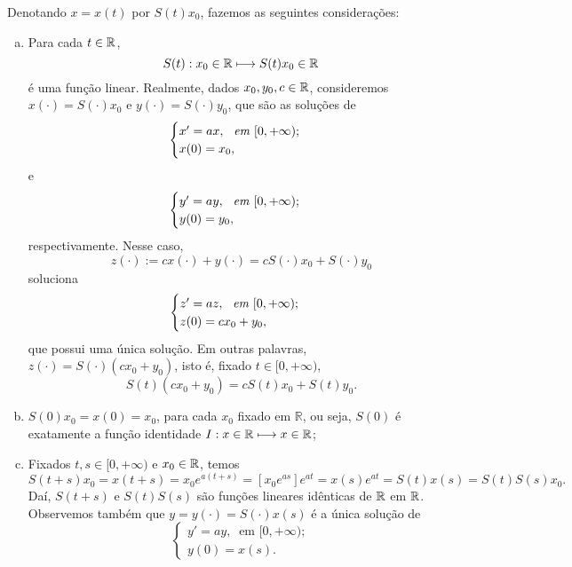 \begin{remark}\label{baby}
Denotando $x=x(t)$ por $S(t)x_0$, fazemos as seguintes considerações:

\begin{enumerate}[(a)]
\item Para cada $t\in \mathbb{R}$, 
\[
\displaystyle S(t): x_0 \in \mathbb{R} \longmapsto S(t)x_0 \in \mathbb{R}
\]
é uma função linear. Realmente, dados $x_0, y_0, c\in \mathbb{R}$, consideremos $x(\cdot) = S(\cdot)x_0$ e $y(\cdot)=S(\cdot)y_0$, que são as soluções de
\[
\begin{cases}
    x'=ax,\ \emph{ em } [0,+\infty);\\
    x(0)=x_0,
\end{cases}
\]
e
\[
\begin{cases}
    y'=ay,\ \emph{ em } [0,+\infty);\\
    y(0)=y_0,
\end{cases}
\]
respectivamente. Nesse caso, 
\[
\displaystyle z(\cdot):=cx(\cdot)+y(\cdot)=cS(\cdot)x_0 + S(\cdot )y_0
\]
soluciona 
\[
\begin{cases}
    z'=az,\ \emph{ em } [0,+\infty);\\
    z(0)=cx_0+y_0,
\end{cases}
\]
que possui uma única solução. Em outras palavras, $z(\cdot) = S(\cdot)(cx_0+y_0)$, isto é, fixado $t\in [0,+\infty)$,
\[
\displaystyle S(t)(cx_0+y_0)=cS(t)x_0+S(t)y_0.
\]
\item $S(0)x_0 = x(0)=x_0$, para cada $x_0$ fixado em $\mathbb R$, ou seja, $S(0)$ é exatamente a função identidade $I:x\in \mathbb{R} \longmapsto x\in \mathbb{R}$;
\item Fixados $t,s\in [0,+\infty)$ e $x_0 \in \mathbb{R}$, temos
\begin{equation*}
\displaystyle S(t+s)x_0 = x(t+s)= x_0 e^{a(t+s)} = [x_0 e^{as}] e^{at} = x(s) e^{at} =S(t)x(s) = S(t) S(s)x_0.
\end{equation*}
Daí, $S(t+s)$ e $S(t)S(s)$ são funções lineares idênticas de $\mathbb{R}$ em $\mathbb{R}$. Observemos também que $y=y(\cdot)=S(\cdot)x(s)$ é a única solução de 
\[
\begin{cases}
    y'=ay,\ \text{ em } [0,+\infty);\\
    y(0)=x(s).
\end{cases}
\]
\end{enumerate}
\end{remark}

